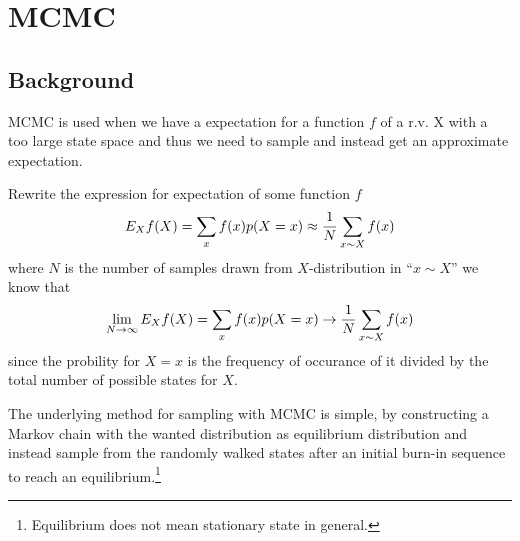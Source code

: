 \documentclass[a4paper,11pt]{kth-mag}
\begin{document}
            \subsection{}
            
        \section{MCMC}
            \subsection{Background}
                MCMC is used when we have a expectation for a function $f$ of a r.v. X with a too large state space 
                and thus we need to sample and instead get an approximate expectation.
                
                Rewrite the expression for expectation of some function $f$
                \begin{equation}
                    E_X f(X) 
                    = \sum\limits_x f(x)p{(X=x)} 
                    \approx \frac{1}{N} \sum\limits_{x\sim X} f(x)
                \end{equation}
                where $N$ is the number of samples drawn from $X$-distribution in ``$x\sim X$'' we know that
                \begin{equation}
                    \lim_{N\rightarrow\infty} E_X f(X) 
                    = \sum\limits_x f(x)p{(X=x)} 
                    \rightarrow \frac{1}{N} \sum\limits_{x\sim X} f(x)
                \end{equation}
                since the probility for $X=x$ is the frequency of occurance of it 
                divided by the total number of possible states for $X$.
                
                The underlying method for sampling with MCMC is simple, by 
                constructing a Markov chain with the wanted distribution as 
                equilibrium distribution and instead sample from 
                the randomly walked states after an initial burn-in sequence to reach an 
                equilibrium.\footnote{Equilibrium does not mean stationary state in general.}
           
\end{document}
